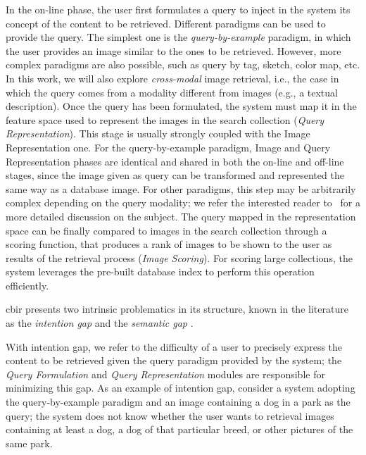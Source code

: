 In the on-line phase, the user first formulates a query to inject in the system its concept of the content to be retrieved.
Different paradigms can be used to provide the query.
The simplest one is the \emph{query-by-example} paradigm, in which the user provides an image similar to the ones to be retrieved.
However, more complex paradigms are also possible, such as query by tag, sketch, color map, etc.
In this work, we will also explore \emph{cross-modal} image retrieval, i.e.,  the case in which the query comes from a modality different from images (e.g., a textual description).
Once the query has been formulated, the system must map it in the feature space used to represent the images in the search collection (\emph{Query Representation}).
This stage is usually strongly coupled with the Image Representation one.
For the query-by-example paradigm, Image and Query Representation phases are identical and shared in both the on-line and off-line stages, since the image given as query can be transformed and represented the same way as a database image.
For other paradigms, this step may be arbitrarily complex depending on the query modality;
we refer the interested reader to~\cite{zhou2017recent} for a more detailed discussion on the subject.
The query mapped in the representation space can be finally compared to images in the search collection through a scoring function, that produces a rank of images to be shown to the user as results of the retrieval process (\emph{Image Scoring}).
For scoring large collections, the system leverages the pre-built database index to perform this operation efficiently.

\acrlong{cbir} presents two intrinsic problematics in its structure, known in the literature as the \emph{intention gap} and the \emph{semantic gap} \cite{datta2008image}.

With intention gap, we refer to the difficulty of a user to precisely express the content to be retrieved given the query paradigm provided by the system;
the \emph{Query Formulation} and \emph{Query Representation} modules are responsible for minimizing this gap.
As an example of intention gap, consider a system adopting the query-by-example paradigm and an image containing a dog in a park as the query;
the system does not know whether the user wants to retrieval images containing at least a dog, a dog of that particular breed, or other pictures of the same park.

